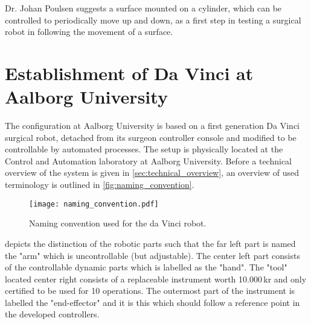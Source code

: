 Dr. Johan Poulsen suggests a surface mounted on a cylinder, which can be controlled to periodically move up and down, as a first step in testing a surgical robot in following the movement of a surface.








%
%
%
%
%
\section{Establishment of Da Vinci at Aalborg University}\label{sec:technical_overview}
%
The configuration at Aalborg University is based on a first generation Da Vinci surgical robot, detached from its surgeon controller console and modified to be controllable by automated processes. The setup is physically located at the Control and Automation laboratory at Aalborg University. Before a technical overview of the system is given in \autoref{sec:technical_overview}, an overview of used terminology is outlined in \autoref{fig:naming_convention}.
\begin{figure}[H]
\centering
\texttt{[image: naming\_convention.pdf]}
\caption{Naming convention used for the da Vinci robot.}
\label{fig:naming_convention}
\end{figure}
 depicts the distinction of the robotic parts such that the far left part is named the "arm" which is uncontrollable (but adjustable). The center left part consists of the controllable dynamic parts which is labelled as the "hand". The "tool" located center right consists of a replaceable instrument worth 10.000\,kr and only certified to be used for 10 operations. The outermost part of the instrument is labelled the "end-effector" and it is  this which should follow a reference point in the developed controllers.

